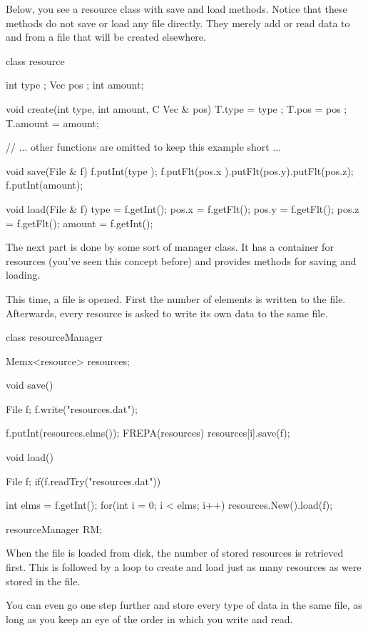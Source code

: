 Below, you see a resource class with save and load methods. Notice that these methods do not save or load any file directly. They merely add or read data to and from a file that will be created elsewhere.

\begin{code}
class resource {
  int type  ;
	Vec pos   ;
	int amount;
	
	void create(int type, int amount, C Vec & pos) {
	  T.type   = type  ;
		T.pos    = pos   ;
		T.amount = amount;
	}
	
	// ... other functions are omitted to keep this example short ...
	
	void save(File & f) {
	  f.putInt(type  );
		f.putFlt(pos.x ).putFlt(pos.y).putFlt(pos.z);
		f.putInt(amount);
	}
	
	void load(File & f) {
	  type   = f.getInt();
		pos.x  = f.getFlt();
		pos.y  = f.getFlt();
		pos.z  = f.getFlt();
		amount = f.getInt();
	}
}	
\end{code}

The next part is done by some sort of manager class. It has a container for resources (you've seen this concept before) and provides methods for saving and loading. 

This time, a file is opened. First the number of elements is written to the file. Afterwards, every resource is asked to write its own data to the same file.

\begin{code}
class resourceManager {
  Memx<resource> resources;
	
	void save() {
		File f;
		f.write("resources.dat");
		
		f.putInt(resources.elms());
		FREPA(resources) {
			resources[i].save(f);
		}
	}
	
	void load() {
	  File f;
		if(f.readTry("resources.dat")) {
			
			int elms = f.getInt();
			for(int i = 0; i < elms; i++) {
				resources.New().load(f);
			}
		}
	}
}

resourceManager RM;
\end{code}

When the file is loaded from disk, the number of stored resources is retrieved first. This is followed by a loop to create and load just as many resources as were stored in the file.

You can even go one step further and store every type of data in the same file, as long as you keep an eye of the order in which you write and read.

